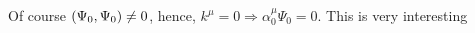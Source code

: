 Of course $\qty(\Psi_0,\Psi_0)\neq 0$, hence, $k^\mu=0\Rightarrow \alpha_0^\mu\Psi_0=0$. This is very interesting








